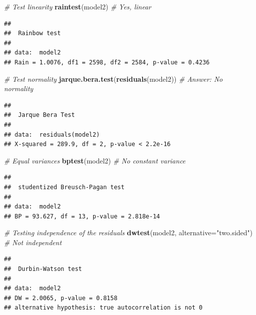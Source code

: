 \documentclass[12pt,]{article}
\newenvironment{Shaded}{\begin{snugshade}}{\end{snugshade}}
\newcommand{\KeywordTok}[1]{\textcolor[rgb]{0.13,0.29,0.53}{\textbf{{#1}}}}
\newcommand{\DataTypeTok}[1]{\textcolor[rgb]{0.13,0.29,0.53}{{#1}}}
\newcommand{\StringTok}[1]{\textcolor[rgb]{0.31,0.60,0.02}{{#1}}}
\newcommand{\CommentTok}[1]{\textcolor[rgb]{0.56,0.35,0.01}{\textit{{#1}}}}
\newcommand{\NormalTok}[1]{{#1}}
\begin{document}
\begin{Shaded}
\begin{Highlighting}[]
\CommentTok{# Test linearity}
\KeywordTok{raintest}\NormalTok{(model2) }\CommentTok{# Yes, linear}
\end{Highlighting}
\end{Shaded}

\begin{verbatim}
## 
##  Rainbow test
## 
## data:  model2
## Rain = 1.0076, df1 = 2598, df2 = 2584, p-value = 0.4236
\end{verbatim}

\begin{Shaded}
\begin{Highlighting}[]
\CommentTok{# Test normality}
\KeywordTok{jarque.bera.test}\NormalTok{(}\KeywordTok{residuals}\NormalTok{(model2)) }\CommentTok{# Answer: No normality}
\end{Highlighting}
\end{Shaded}

\begin{verbatim}
## 
##  Jarque Bera Test
## 
## data:  residuals(model2)
## X-squared = 289.9, df = 2, p-value < 2.2e-16
\end{verbatim}

\begin{Shaded}
\begin{Highlighting}[]
\CommentTok{# Equal variances}
\KeywordTok{bptest}\NormalTok{(model2) }\CommentTok{# No constant variance}
\end{Highlighting}
\end{Shaded}

\begin{verbatim}
## 
##  studentized Breusch-Pagan test
## 
## data:  model2
## BP = 93.627, df = 13, p-value = 2.818e-14
\end{verbatim}

\begin{Shaded}
\begin{Highlighting}[]
\CommentTok{# Testing independence of the residuals}
\KeywordTok{dwtest}\NormalTok{(model2, }\DataTypeTok{alternative=}\StringTok{"two.sided"}\NormalTok{) }\CommentTok{# Not independent}
\end{Highlighting}
\end{Shaded}

\begin{verbatim}
## 
##  Durbin-Watson test
## 
## data:  model2
## DW = 2.0065, p-value = 0.8158
## alternative hypothesis: true autocorrelation is not 0
\end{verbatim}
\end{document}
